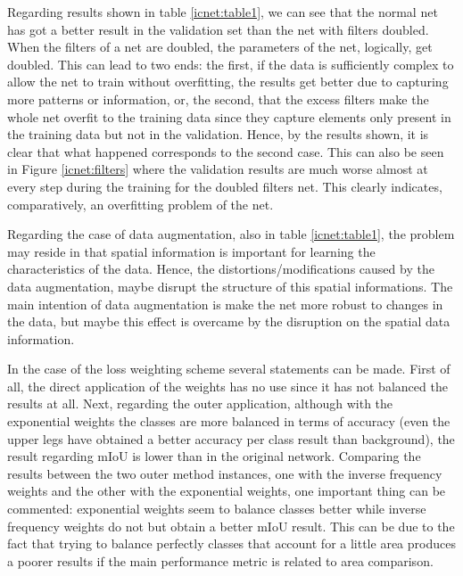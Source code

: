 \documentclass[12pt,a4paper]{article}
\begin{document}
Regarding results shown in table \ref{icnet:table1}, we can see that the normal net has got a better result in the validation set than the net with filters doubled. When the filters of a net are doubled, the parameters of the net, logically, get doubled. This can lead to two ends: the first, if the data is sufficiently complex to allow the net to train without overfitting, the results get better due to capturing more patterns or information, or, the second, that the excess filters make the whole net overfit to the training data since they capture elements only present in the training data but not in the validation. Hence, by the results shown, it is clear that what happened corresponds to the second case. This can also be seen in Figure \ref{icnet:filters} where the validation results are much worse almost at every step during the training for the doubled filters net. This clearly indicates, comparatively, an overfitting problem of the net.\newline

Regarding the case of data augmentation, also in table \ref{icnet:table1}, the problem may reside in that spatial information is important for learning the characteristics of the data. Hence, the distortions/modifications caused by the data augmentation, maybe disrupt the structure of this spatial informations. The main intention of data augmentation is make the net more robust to changes in the data, but maybe this effect is overcame by the disruption on the spatial data information.\newline

In the case of the loss weighting scheme several statements can be made. First of all, the direct application of the weights has no use since it has not balanced the results at all. Next, regarding the outer application, although with the exponential weights the classes are more balanced in terms of accuracy (even the upper legs have obtained a better accuracy per class result than background), the result regarding mIoU is lower than in the original network. Comparing the results between the two outer method instances, one with the inverse frequency weights and the other with the exponential weights, one important thing can be commented: exponential weights seem to balance classes better while inverse frequency weights do not but obtain a better mIoU result. This can be due to the fact that trying to balance perfectly classes that account for a little area produces a poorer results if the main performance metric is related to area comparison.\newline
\end{document}
